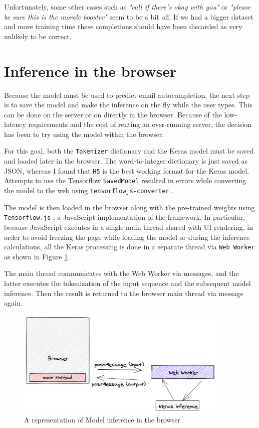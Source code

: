 \documentclass{article}
\begin{document}
Unfortunately, some other cases such as \textit{"call if there's okay with you"} or \textit{"please be sure this is the morale booster"} seem to be a bit off. If we had a bigger dataset and more training time these completions should have been discarded as very unlikely to be correct.

\section{Inference in the browser}\label{inference-in-the-browser}

Because the model must be used to predict email autocompletion, the next step is to save the model and make the inference on the fly while the user types. This can be done on the server or on directly in the browser. Because of the low-latency requirements and the cost of renting an ever-running server, the decision has been to try using the model within the browser.

For this goal, both the \texttt{Tokenizer} dictionary and the Keras model must be saved and loaded later in the browser. The word-to-integer dictionary is just saved as JSON, whereas I found that \texttt{H5} is the best working format for the Keras model. Attempts to use the Tensorflow \texttt{SavedModel} \cite{saved-model} resulted in errors while converting the model to the web using \texttt{tensorflowjs-converter} \cite{model-conversion}.

The model is then loaded in the browser along with the pre-trained weights using \texttt{Tensorflow.js} \cite{tensorflowjs}, a JavaScript implementation of the framework. In particular, because JavaScript executes in a single main thread shared with UI rendering, in order to avoid freezing the page while loading the model or during the inference calculations, all the Keras processing is done in a separate thread via \texttt{Web Worker} \cite{web-worker} as shown in Figure \ref{keras-web-worker}.

The main thread communicates with the Web Worker via messages, and the latter executes the tokenization of the input sequence and the subsequent model inference. Then the result is returned to the browser main thread via message again.

\begin{figure}[htbp]
\centering
\includegraphics[width=4in]{images/keras-web-worker.png}
\caption{A representation of Model inference in the browser}
\label{keras-web-worker}
\end{figure}
\end{document}
